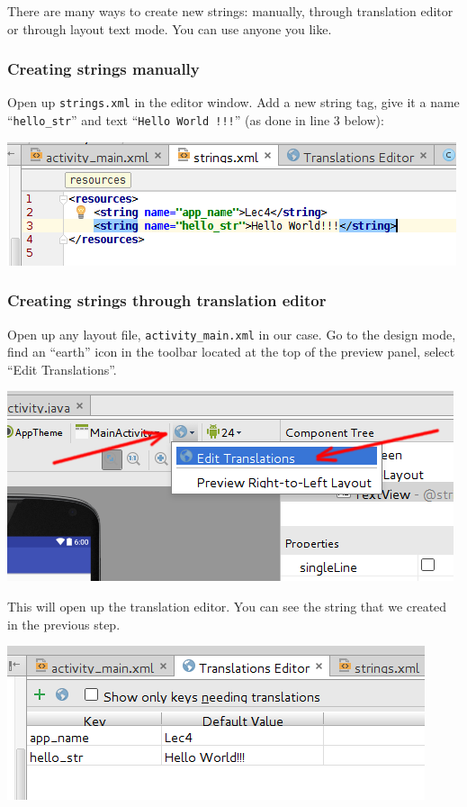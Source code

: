 There are many ways to create new strings: manually, through translation editor or through layout text mode. You can use anyone you like.

\subsubsection{Creating strings manually}
Open up \texttt{strings.xml} in the editor window. Add a new string tag, give it a name ``\texttt{hello\_str}'' and text ``\texttt{Hello World !!!}'' (as done in line 3 below):

\begin{center}
	\includegraphics[scale=0.4]{chapters/ch04/images/5_new_string1}
\end{center}

\subsubsection{Creating strings through translation editor}
Open up any layout file, \texttt{activity\_main.xml} in our case. Go to the design mode, find an ``earth'' icon in the toolbar located at the top of the preview panel, select ``Edit Translations''.

\begin{center}
	\includegraphics[scale=0.4]{chapters/ch04/images/9}
\end{center}

This will open up the translation editor. You can see the string that we created in the previous step. 

\begin{center}
	\includegraphics[scale=0.4]{chapters/ch04/images/11}
\end{center}

